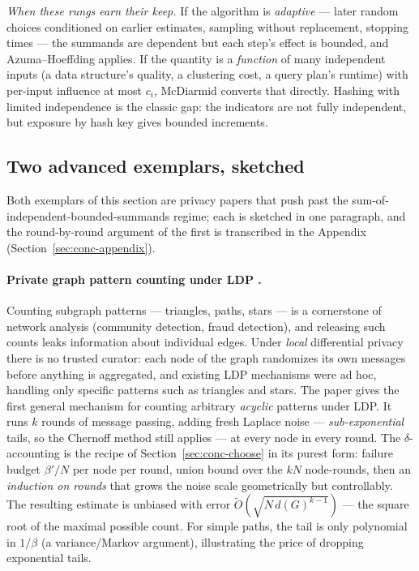 \emph{When these rungs earn their keep.} If the algorithm is \emph{adaptive} --- later
random choices conditioned on earlier estimates, sampling without replacement, stopping
times --- the summands are dependent but each step's effect is bounded, and
Azuma--Hoeffding applies. If the quantity is a \emph{function} of many independent
inputs (a data structure's quality, a clustering cost, a query plan's runtime) with
per-input influence at most $c_i$, McDiarmid converts that directly. Hashing with
limited independence is the classic gap: the indicators are not fully independent, but
exposure by hash key gives bounded increments.

\subsection{Two advanced exemplars, sketched}
\label{sec:conc-ldp}

Both exemplars of this section are privacy papers that push past the
sum-of-independent-bounded-summands regime; each is sketched in one paragraph, and the
round-by-round argument of the first is transcribed in the
Appendix (Section~\ref{sec:conc-appendix}).

\paragraph{Private graph pattern counting under LDP \cite{sigmod26-012}.}
Counting subgraph patterns --- triangles, paths, stars --- is a cornerstone of network
analysis (community detection, fraud detection), and releasing such counts leaks
information about individual edges. Under \emph{local} differential privacy there is no
trusted curator: each node of the graph randomizes its own messages before anything is
aggregated, and existing LDP mechanisms were ad hoc, handling only specific patterns
such as triangles and stars. The paper gives the first general mechanism for counting
arbitrary \emph{acyclic} patterns under LDP. It runs $k$ rounds of message passing,
adding fresh Laplace noise --- \emph{sub-exponential} tails, so the Chernoff method
still applies --- at every node in every round. The $\delta$-accounting is the recipe of
Section~\ref{sec:conc-choose} in its purest form: failure budget $\beta'/N$ per node
per round, union bound over the $kN$ node-rounds, then an \emph{induction on rounds}
that grows the noise scale geometrically but controllably. The resulting estimate is
unbiased with error $\widetilde{O}(\sqrt{N\,d(G)^{k-1}})$ --- the square root of the
maximal possible count. For simple paths, the tail is only polynomial in $1/\beta$
(a variance/Markov argument), illustrating the price of dropping exponential tails.

